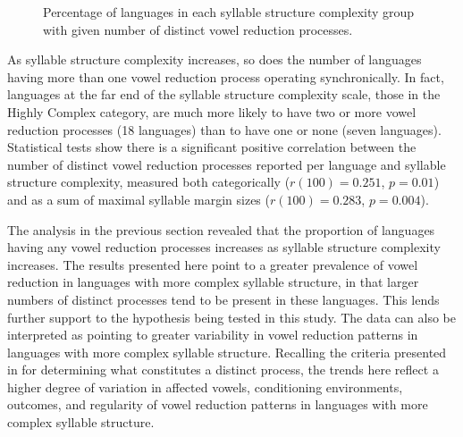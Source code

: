   
\begin{figure}
\caption{\label{fig:6.1}Percentage of languages in each syllable structure complexity group with given number of distinct vowel reduction processes.}
\end{figure}

  As syllable structure complexity increases, so does the number of languages having more than one vowel reduction process operating synchronically. In fact, languages at the far end of the syllable structure complexity scale, those in the Highly Complex category, are much more likely to have two or more vowel reduction processes (18 languages) than to have one or none (seven languages). Statistical tests show there is a significant positive correlation between the number of distinct vowel reduction processes reported per language and syllable structure complexity, measured both categorically ($r(100) = 0.251$, $p = 0.01$) and as a sum of maximal syllable margin sizes ($r(100) = 0.283$, $p = 0.004$).

  The analysis in the previous section revealed that the proportion of languages having any vowel reduction processes increases as syllable structure complexity increases. The results presented here point to a greater prevalence of vowel reduction in languages with more complex syllable structure, in that larger numbers of distinct processes tend to be present in these languages. This lends further support to the hypothesis being tested in this study. The data can also be interpreted as pointing to greater variability in vowel reduction patterns in languages with more complex syllable structure. Recalling the criteria presented in  for determining what constitutes a distinct process, the trends here reflect a higher degree of variation in affected vowels, conditioning environments, outcomes, and regularity of vowel reduction patterns in languages with more complex syllable structure.

